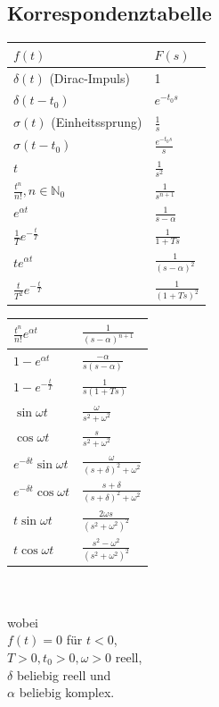 \documentclass[10pt,a4paper]{article}
\begin{document}
\pagebreak
\begin{multicols}{2}
\subsection{Korrespondenztabelle}

\begin{tabularx}{\columnwidth}{|X|X|}
	\hline
	$f(t)$ & $F(s)$ \\
	\hline
	\hline
	$\delta(t)$ (Dirac-Impuls)& 1 \\
	\hline
	$\delta(t - t_0)$ & $e^{-t_0 s}$ \\
	\hline
	$\sigma(t)$ (Einheitssprung) & $\frac 1 s$ \\
	\hline
	$\sigma(t - t_0)$ & $\frac{e^{-t_0 s}}{s}$ \\
	\hline
	$t$ & $\frac{1}{s^2}$ \\
	\hline
	$\frac{t^n}{n!}, n \in \mathbb{N}_0$ & $\frac{1}{s^{n + 1}}$ \\
	\hline
	$e^{\alpha t}$ & $\frac{1}{s - \alpha}$ \\
	\hline
	$\frac 1 T e^{-\frac t T}$ & $\frac{1}{1 + Ts}$ \\
	\hline
	$te^{\alpha t}$ & $\frac{1}{(s - \alpha)^2}$ \\
	\hline
	$\frac{t}{T^2} e^{- \frac t T}$ & $\frac{1}{(1 + Ts)^2}$ \\
	\hline
\end{tabularx}
\begin{tabularx}{\columnwidth}{|X|X|}
	$\frac{t^n}{n!}e^{\alpha t}$ & $\frac{1}{(s - \alpha)^{n + 1}}$ \\
	\hline
	$1 - e^{\alpha t}$ & $\frac{-\alpha}{s(s - \alpha)}$ \\
	\hline
	$1 - e^{-\frac{t}{T}}$ & $\frac{1}{s(1 + Ts)}$ \\
	\hline
	$\sin \omega t$ & $\frac{\omega}{s^2 + \omega^2}$ \\
	\hline
	$\cos \omega t$ & $\frac{s}{s^2 + \omega^2}$ \\
	\hline
	$e^{-\delta t}\sin \omega t$ & $\frac{\omega}{(s + \delta)^2 + \omega^2}$ \\
	\hline
	$e^{-\delta t}\cos \omega t$ & $\frac{s + \delta}{(s + \delta)^2 + \omega^2}$ \\
	\hline
	$t \sin \omega t$ & $\frac{2 \omega s}{(s^2 + \omega^2)^2}$ \\
	\hline
	$t \cos \omega t$ & $\frac{s^2 - \omega^2}{(s^2 + \omega^2)^2}$ \\
	\hline	
\end{tabularx} \\
\\

wobei \\
$f(t) = 0$ für $t < 0$, \\
$T > 0, t_0 > 0, \omega > 0$ reell, \\
$\delta$ beliebig reell und \\
$\alpha$ beliebig komplex.
\end{multicols}
\end{document}
